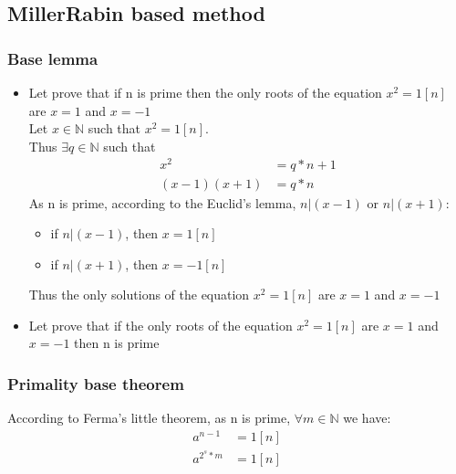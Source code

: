 \documentclass[12pt]{article} %
\begin{document}
\subsection{Miller\-Rabin based method}
\subsubsection{Base lemma}
\begin{itemize}
	\item Let prove that if n is prime then the only roots of the equation $x^{2} = 1 [n]$ are $x = 1$ and $x = -1$\\
        Let $x \in \mathbb{N}$ such that $x^{2} = 1 [n]$.\\
        Thus $\exists q \in \mathbb{N}$ such that
        \begin{equation}
        \begin{aligned}
            x^2				&= q*n + 1\\
            (x - 1) (x + 1) &= q*n
        \end{aligned}
        \end{equation}
        As n is prime, according to the Euclid's lemma, $n | (x-1)$ or $n | (x+1)$:
        \begin{itemize}
            \item if $n | (x-1)$, then $x = 1 [n]$
            \item if $n | (x+1)$, then $x = -1 [n]$
        \end{itemize}
        Thus the only solutions of the equation $x^{2} = 1 [n]$ are $x = 1$ and $x = -1$\\

    \item Let prove that if the only roots of the equation $x^{2} = 1 [n]$ are $x = 1$ and $x = -1$ then n is prime\\
\end{itemize}




\subsubsection{Primality base theorem}
According to Ferma's little theorem, as n is prime, $\forall m \in \mathbb{N}$ we have:
\begin{equation}
\begin{aligned}
	a ^ {n-1} &= 1 [n]\\
	a ^ {2^{s} *m } &= 1 [n]\\
\end{aligned}
\end{equation}
\end{document}
